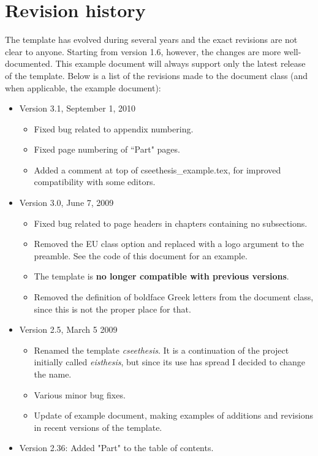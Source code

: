 \section{Revision history}
The template has evolved during several years and the exact
revisions are not clear to anyone. Starting from version 1.6,
however, the changes are more well-documented. This example
document will always support only the latest release of the
template. Below is a list of the revisions made to the document
class (and when applicable, the example document):%
\begin{itemize}
	 \item Version 3.1, September 1, 2010
		\begin{itemize}
			\item Fixed bug related to appendix numbering.
			\item Fixed page numbering of ``Part" pages.
			\item Added a comment at top of cseethesis\_example.tex, for improved compatibility with some editors.
		\end{itemize}
	 \item Version 3.0, June 7, 2009
		\begin{itemize}
			\item Fixed bug related to page headers in chapters containing no subsections.
		   \item Removed the EU class option and replaced with a logo argument to the preamble. See the code of this document for an example.
			\item The template is \textbf{no longer compatible with previous versions}.
         \item Removed the definition of boldface Greek letters from the document class, since this is not the proper place for that.
		\end{itemize}
  	 \item Version 2.5, March 5 2009
		\begin{itemize}
         \item Renamed the template \textit{cseethesis}. It is a continuation of the project initially called \textit{eisthesis}, but since its use has spread I decided to change the name.
			\item Various minor bug fixes.
			\item Update of example document, making examples of additions and revisions in recent versions of the template.
		\end{itemize}
	 \item Version 2.36: Added "Part" to the table of contents.

\end{itemize}
